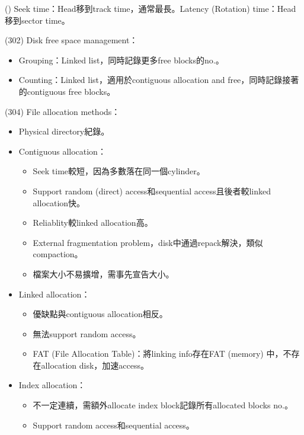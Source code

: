 \begin{theorem}{()} Seek time：Head移到track time，通常最長。Latency (Rotation) time：Head移到sector time。
\end{theorem}

\begin{theorem}{(302)} Disk free space management：\begin{itemize}
        \item Grouping：Linked list，同時記錄更多free blocks的no.。
        \item Counting：Linked list，適用於contiguous allocation and free，同時記錄接著的contiguous free blocks。
    \end{itemize}
\end{theorem}

\begin{theorem}{(304)} File allocation methods：\begin{itemize}
        \item Physical directory紀錄。
        \item Contiguous allocation：\begin{itemize}
            \item Seek time較短，因為多數落在同一個cylinder。
            \item Support random (direct) access和sequential access且後者較linked allocation快。
            \item Reliablity較linked allocation高。
            \item External fragmentation problem，disk中通過repack解決，類似compaction。
            \item 檔案大小不易擴增，需事先宣告大小。
        \end{itemize}
        \item Linked allocation：\begin{itemize}
            \item 優缺點與contiguous allocation相反。
            \item 無法support random access。
            \item FAT (File Allocation Table)：將linking info存在FAT (memory) 中，不存在allocation disk，加速access。
        \end{itemize}
        \item Index allocation：\begin{itemize}
            \item 不一定連續，需額外allocate index block記錄所有allocated blocks no.。
            \item Support random access和sequential access。

\end{itemize}
\end{itemize}
\end{theorem}
